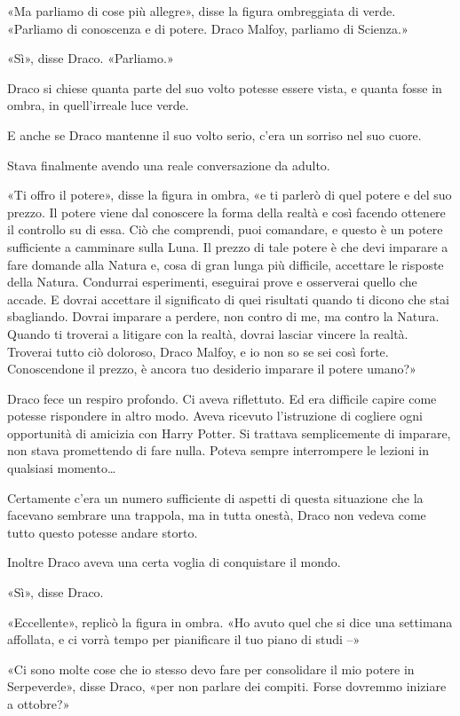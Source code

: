 «Ma parliamo di cose più allegre», disse la figura ombreggiata di verde. «Parliamo di conoscenza e di potere. Draco Malfoy, parliamo di Scienza.»

«Sì», disse Draco. «Parliamo.»

Draco si chiese quanta parte del suo volto potesse essere vista, e quanta fosse in ombra, in quell’irreale luce verde.

E anche se Draco mantenne il suo volto serio, c’era un sorriso nel suo cuore.

Stava finalmente avendo una reale conversazione da adulto.

«Ti offro il potere», disse la figura in ombra, «e ti parlerò di quel potere e del suo prezzo. Il potere viene dal conoscere la forma della realtà e così facendo ottenere il controllo su di essa. Ciò che comprendi, puoi comandare, e questo è un potere sufficiente a camminare sulla Luna. Il prezzo di tale potere è che devi imparare a fare domande alla Natura e, cosa di gran lunga più difficile, accettare le risposte della Natura. Condurrai esperimenti, eseguirai prove e osserverai quello che accade. E dovrai accettare il significato di quei risultati quando ti dicono che stai sbagliando. Dovrai imparare a perdere, non contro di me, ma contro la Natura. Quando ti troverai a litigare con la realtà, dovrai lasciar vincere la realtà. Troverai tutto ciò doloroso, Draco Malfoy, e io non so se sei così forte. Conoscendone il prezzo, è ancora tuo desiderio imparare il potere umano?»

Draco fece un respiro profondo. Ci aveva riflettuto. Ed era difficile capire come potesse rispondere in altro modo. Aveva ricevuto l’istruzione di cogliere ogni opportunità di amicizia con Harry Potter. Si trattava semplicemente di imparare, non stava promettendo di fare nulla. Poteva sempre interrompere le lezioni in qualsiasi momento…

Certamente c’era un numero sufficiente di aspetti di questa situazione che la facevano sembrare una trappola, ma in tutta onestà, Draco non vedeva come tutto questo potesse andare storto.

Inoltre Draco aveva una certa voglia di conquistare il mondo.

«Sì», disse Draco.

«Eccellente», replicò la figura in ombra. «Ho avuto quel che si dice una settimana affollata, e ci vorrà tempo per pianificare il tuo piano di studi –»

«Ci sono molte cose che io stesso devo fare per consolidare il mio potere in Serpeverde», disse Draco, «per non parlare dei compiti. Forse dovremmo iniziare a ottobre?»

